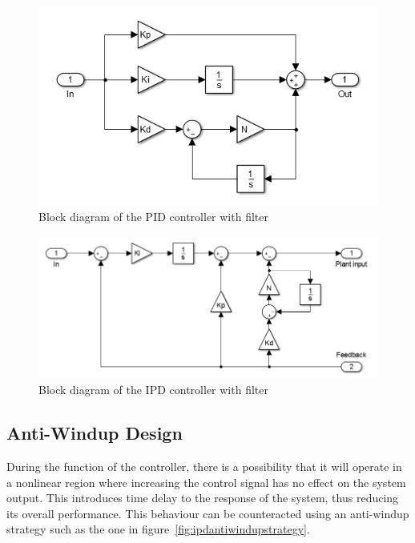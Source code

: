 \begin{figure}[!h]
	\centering
	\includegraphics[width=.7\linewidth]{graphics/pidwfilter}
	\caption{Block diagram of the PID controller with filter}
	\label{fig:pidfilter}
\end{figure}

\begin{figure}[!h]
	\centering
	\includegraphics[width=.9\linewidth]{graphics/ipdwfilter}
	\caption{Block diagram of the IPD controller with filter}
	\label{fig:ipdfilter}
\end{figure}


\subsection{Anti-Windup Design}
During the function of the controller, there is a possibility that it will operate in a nonlinear region where increasing the control signal has no effect on the system output. 
This introduces time delay to the response of the system, thus reducing its overall performance. 
This behaviour can be counteracted using an anti-windup strategy such as the one in figure~\ref{fig:ipdantiwindupstrategy}.

